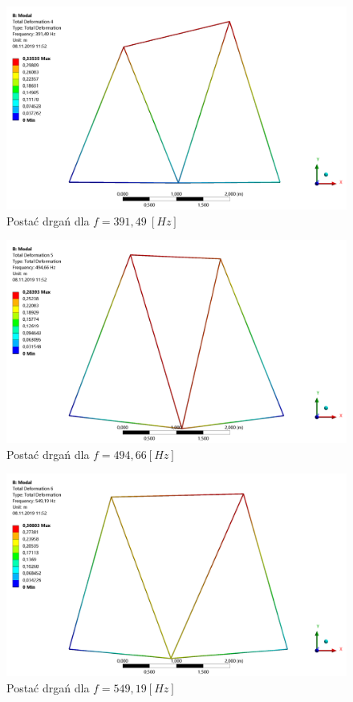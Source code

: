 \documentclass[12pt, a4papper, twoside]{article}
\begin{document}
\begin{figure}[H]
    \centering
    \includegraphics[width=\textwidth, height=0.6\textwidth]{mode4.png}
    \caption{Postać drgań dla $f=391,49\ [Hz]$}
    \label{rys:mode4}
\end{figure}

\begin{figure}[H]
    \centering
    \includegraphics[width=\textwidth, height=0.6\textwidth]{mode5.png}
    \caption{Postać drgań dla $f=494,66 [Hz]$}
    \label{rys:mode5}
\end{figure}

\begin{figure}[H]
    \centering
    \includegraphics[width=\textwidth, height=0.6\textwidth]{mode6.png}
    \caption{Postać drgań dla $f=549,19 [Hz]$}
    \label{rys:mode6}
\end{figure}
\end{document}
